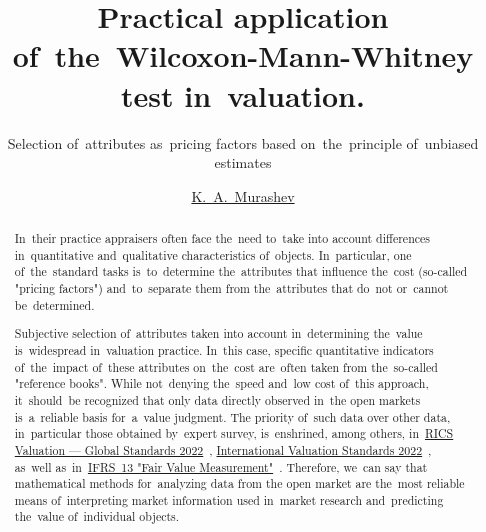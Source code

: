 \documentclass[]{scrreprt}
\title{Practical application of~the~Wilcoxon-Mann-Whitney test in~valuation.}
\subtitle{Selection of~attributes as~pricing factors based on~the~principle of~unbiased estimates}
\author{\href{https://www.facebook.com/groups/1977067932456703}{K.~A.~Murashev}}
\begin{document}
\maketitle
%
%	
\begin{abstract}
	In~their practice appraisers often face the~need to~take into account differences in~quantitative and~qualitative characteristics of~objects. In~particular, one of~the~standard tasks is~to~determine the~attributes that influence the~cost (so-called "pricing factors") and~to~separate them from the~attributes that do~not or~cannot be~determined.
	
	Subjective selection of~attributes taken into account in~determining the~value is~widespread in~valuation practice. In~this case, specific quantitative indicators of~the~impact of~these attributes on~the~cost are~often taken from the~so-called "reference books". While not~denying the~speed and~low cost of~this approach, it~should~be recognized that only data directly observed in~the open markets is~a~reliable basis for~a~value judgment. The priority of~such data over other data, in~particular those obtained by~expert survey, is~enshrined, among others, in~\href{https://www.rics.org/uk/upholding-professional-standards/sector-standards/valuation/red-book/red-book-global/}{RICS Valuation --- Global Standards 2022}~\cite{RVGS-2022}, \href{https://www.rics.org/uk/upholding-professional-standards/sector-standards/valuation/red-book/international-valuation-standards/}{International Valuation Standards 2022}~\cite{IVS-2022}, as~well as~in~\href{http://eifrs.ifrs.org/eifrs/bnstandards/en/IFRS13.pdf}{IFRS~13 "Fair Value Measurement"}~\cite{IFRS-13}. Therefore, we~can say that mathematical methods for~analyzing data from the open market are the~most reliable means of~interpreting market information used in~market research and~predicting the~value of~individual objects.
	

\end{abstract}
\end{document}
